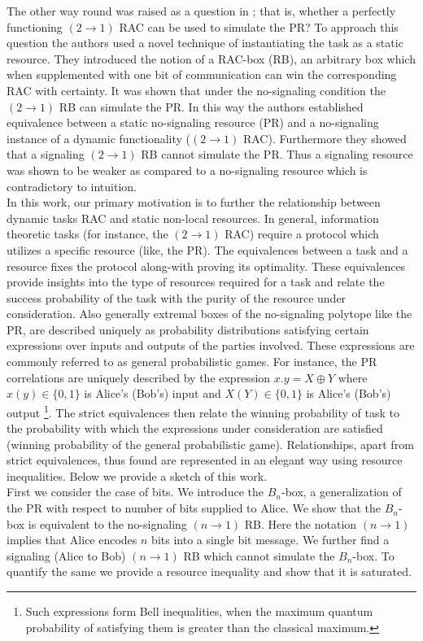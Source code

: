 \documentclass[%
 reprint,
 amsmath,amssymb,
 aps,
]{revtex4-1}
\begin{document}
The other way round was raised as a question in \cite{grudka2014popescu}; that is, whether a perfectly functioning $(2\rightarrow1)$ RAC can be used to simulate the PR? To approach this question the authors used a novel technique of instantiating the task as a static resource. They introduced the notion of a  RAC-box (RB), an arbitrary box which when supplemented with one bit of communication can win the corresponding RAC with certainty. It was shown that under the no-signaling condition the $(2\rightarrow1)$ RB can simulate the PR. 
In this way the authors established equivalence between a static no-signaling resource (PR) and a no-signaling instance of a dynamic functionality ($(2\rightarrow1)$ RAC). Furthermore they showed that a signaling $(2\rightarrow1)$ RB cannot simulate the PR. Thus a signaling resource was shown to be weaker as compared to a no-signaling resource which is contradictory to intuition. \\ 
In this work, our primary motivation is to further the relationship between dynamic tasks RAC and static non-local resources. In general, information theoretic tasks (for instance, the $(2 \rightarrow 1)$ RAC) require a protocol which utilizes a specific resource (like, the PR). The equivalences between a task and a resource fixes the protocol along-with proving its optimality. These equivalences provide insights into the type of resources required for a task and relate the success probability of the task with the purity of the resource under consideration. Also generally extremal boxes of the no-signaling polytope like the PR, are described uniquely as probability distributions satisfying certain expressions over inputs and outputs of the parties involved. These expressions are commonly referred to as general probabilistic games. For instance, the PR correlations are uniquely described by the expression $x.y=X\oplus Y$ where $x(y)\in \{0,1\}$ is Alice's (Bob's) input and $X(Y) \in \{0,1\}$ is Alice's (Bob's) output \footnote{Such expressions form Bell inequalities, when the maximum quantum probability of satisfying them is greater than the classical maximum.}.
The strict equivalences then relate the winning probability of task to the probability with which the expressions under consideration are satisfied (winning probability of the general probabilistic game). 
Relationships, apart from strict equivalences, thus found are represented in an elegant way using resource inequalities. Below we provide a sketch of this work.\\ 
First we consider the case of bits. We introduce the $B_n$-box, a generalization of the PR with respect to number of bits supplied to Alice. We show that the $B_n$-box is equivalent to the no-signaling $(n\rightarrow 1)$ RB. Here the notation $(n\rightarrow 1)$ implies that Alice encodes $n$ bits into a single bit message. We further find a signaling (Alice to Bob) $(n\rightarrow 1)$ RB which cannot simulate the $B_n$-box. To quantify the same we provide a resource inequality and show that it is saturated. 
\end{document}
